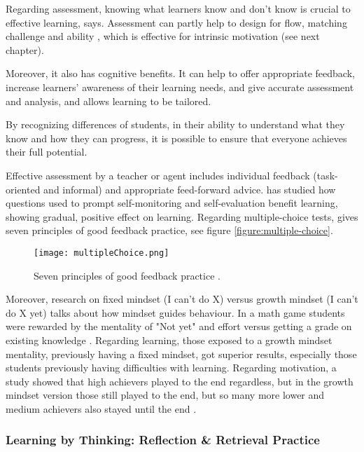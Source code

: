  Regarding assessment, knowing what learners know and don't know is crucial to effective learning, \cite{luckin} says. Assessment can partly help to design for flow, matching challenge and ability \citep{bruhlmann}, which is effective for intrinsic motivation (see next chapter).

  Moreover, it also has cognitive benefits. It can help to offer appropriate feedback, increase learners' awareness of their learning needs, and give accurate assessment and analysis, and allows learning to be tailored.

  By recognizing differences of students, in their ability to understand what they know and how they can progress, it is possible to ensure that everyone achieves their full potential.

  Effective assessment by a teacher or agent includes individual feedback (task-oriented and informal) and appropriate feed-forward advice. \cite{sitzmann} has studied how questions used to prompt self-monitoring and self-evaluation benefit learning, showing gradual, positive effect on learning. Regarding multiple-choice tests, \cite{nicol} gives seven principles of good feedback practice, see figure \ref{figure:multiple-choice}.

  \begin{figure}[h]
    \centering
    \texttt{[image: multipleChoice.png]}
    \caption{Seven principles of good feedback practice \cite{nicol}.}
    \label{fig:sierra-practice}
\end{figure}

  Moreover, research on fixed mindset (I can't do X) versus growth mindset (I can't do X yet) talks about how mindset guides behaviour. In a math game students were rewarded by the mentality of "Not yet" and effort versus getting a grade on existing knowledge \citep{dweck-youtube}. Regarding learning, those exposed to a growth mindset mentality, previously having a fixed mindset, got superior results, especially those students previously having difficulties with learning. Regarding motivation, a study showed that high achievers played to the end regardless, but in the growth mindset version those still played to the end, but so many more lower and medium achievers also stayed until the end \citep{dweck-youtube}.

  \subsubsection{Learning by Thinking: Reflection \& Retrieval Practice}

